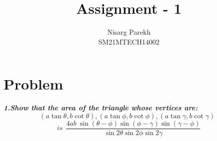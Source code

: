 \documentclass[journal,12pt,twocolumn]{IEEEtran}
\begin{document}
\providecommand{\sbrak}[1]{\ensuremath{{}\left[#1\right]}}
\providecommand{\lsbrak}[1]{\ensuremath{{}\left[#1\right.}}
\providecommand{\rsbrak}[1]{\ensuremath{{}\left.#1\right]}}
\providecommand{\brak}[1]{\ensuremath{\left(#1\right)}}
\providecommand{\lbrak}[1]{\ensuremath{\left(#1\right.}}
\providecommand{\rbrak}[1]{\ensuremath{\left.#1\right)}}
\providecommand{\cbrak}[1]{\ensuremath{\left\{#1\right\}}}
\providecommand{\lcbrak}[1]{\ensuremath{\left\{#1\right.}}
\providecommand{\rcbrak}[1]{\ensuremath{\left.#1\right\}}}
\newcommand{\myvec}[1]{\ensuremath{\begin{pmatrix}#1\end{pmatrix}}}
\newcommand{\cmyvec}[1]{\ensuremath{\begin{pmatrix*}[c]#1\end{pmatrix*}}}
\newcommand{\mydet}[1]{\ensuremath{\begin{vmatrix}#1\end{vmatrix}}}
\newcommand{\proj}[2]{\textbf{proj}_{\vec{#1}}\vec{#2}}
\let\StandardTheFigure\thefigure
\let\vec\mathbf

\title{
Assignment - 1
}
\author{ Nisarg Parekh \\SM21MTECH14002}
\maketitle
\newpage
\bigskip

\section*{\textbf{Problem}}
\noindent
\textbf{\textsl{1.Show that the area of the triangle whose vertices are:
$$(a \tan\theta, b\cot\theta),(a \tan \phi, b\cot \phi),(a \tan \gamma, b\cot \gamma)~~$$
$$ is~~  \frac{4ab~\sin(\theta-\phi)\sin(\phi-\gamma)\sin(\gamma-\phi)}{\sin2\theta\sin2\phi\sin2\gamma}$$ }}



\noindent
\end{document}
